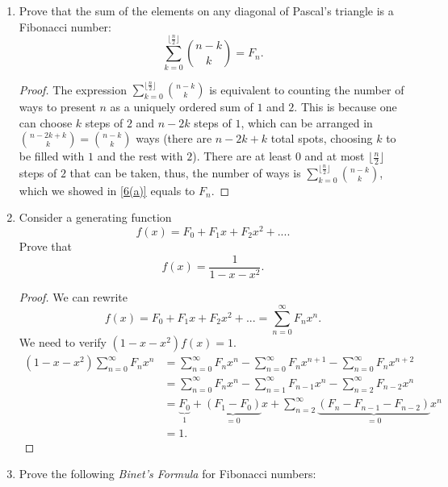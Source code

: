 \documentclass{article}
\begin{document}
\begin{enumerate}[label=(\alph*)]
\begin{proof}
\begin{align*}
        &=F_n^2+F_nF_{n-1}-2F_nF_{n-1}-F_{n-1}^2\\
        &=F_n^2-F_nF_{n-1}-F_{n-1}^2\\
        &=F_n^2-F_{n-1}(F_n+F_{n-1})\\
        &=F_n^2-F_{n+1}F_{n-1}\\
        &=(-1)(F_{n+1}F_{n-1}-F_n^2)\\
        &=(-1)(-1)^{n+1}\\
        &=(-1)^{n+2}.
    \end{align*}
    \end{proof}
    \item Prove that the sum of the elements on any diagonal of Pascal's triangle is a Fibonacci number:
    \[\sum_{k=0}^{\lfloor\frac{n}{2}\rfloor}\binom{n-k}{k}=F_n.\]
    \begin{proof}
    The expression $\sum_{k=0}^{\lfloor\frac{n}{2}\rfloor}\binom{n-k}{k}$ is equivalent to counting the number of ways to present $n$ as a uniquely ordered sum of $1$ and $2$. This is because one can choose $k$ steps of $2$ and $n-2k$ steps of $1$, which can be arranged in $\binom{n-2k+k}{k}=\binom{n-k}{k}$ ways (there are $n-2k+k$ total spots, choosing $k$ to be filled with $1$ and the rest with $2$). There are at least $0$ and at most $\lfloor\frac{n}{2}\rfloor$ steps of $2$ that can be taken, thus, the number of ways is $\sum_{k=0}^{\lfloor\frac{n}{2}\rfloor}\binom{n-k}{k}$, which we showed in \ref{6(a)} equals to $F_n$.
    \end{proof}
    \item Consider a generating function 
    \[f(x)=F_0+F_1x+F_2x^2+....\]
    Prove that 
    \[f(x)=\frac{1}{1-x-x^2}.\]
    \begin{proof}
    We can rewrite 
    \[f(x)=F_0+F_1x+F_2x^2+...= \sum_{n=0}^\infty F_nx^n.\]
    We need to verify $(1-x-x^2)f(x)=1$.
    \begin{align*}
        (1-x-x^2)\sum_{n=0}^\infty F_nx^n &= \sum_{n=0}^\infty F_nx^n - \sum_{n=0}^\infty F_nx^{n+1} - \sum_{n=0}^\infty F_nx^{n+2}\\
        &= \sum_{n=0}^\infty F_nx^n - \sum_{n=1}^\infty F_{n-1}x^n-\sum_{n=2}^\infty F_{n-2}x^n\\
        &= \underbrace{F_0}_1 + \underbrace{(F_1-F_0)}_{=0}x + \sum_{n=2}^\infty \underbrace{(F_n-F_{n-1}-F_{n-2})}_{=0}x^n\\
        &= 1.
    \end{align*}
    \end{proof}
    \item Prove the following \textit{Binet's Formula} for Fibonacci numbers:

\end{enumerate}
\end{document}
